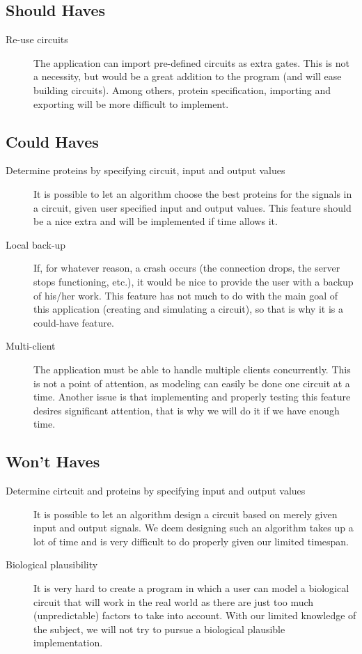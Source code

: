 \documentclass[a4paper]{article}
\begin{document}
\subsection{Should Haves}
\begin{description}
\item[Re-use circuits] The application can import pre-defined circuits as extra gates. This is not a necessity, but would be a great addition to the program (and will ease building circuits). Among others, protein specification, importing and exporting will be more difficult to implement.
\end{description}

\subsection{Could Haves}
\begin{description}
\item[Determine proteins by specifying circuit, input and output values] It is possible to let an algorithm choose the best proteins for the signals in a circuit, given user specified input and output values. This feature should be a nice extra and will be implemented if time allows it.
\item[Local back-up] If, for whatever reason, a crash occurs (the connection drops, the server stops functioning, etc.), it would be nice to provide the user with a backup of his/her work. This feature has not much to do with the main goal of this application (creating and simulating a circuit), so that is why it is a could-have feature.
\item[Multi-client] The application must be able to handle multiple clients concurrently. This is not a point of attention, as modeling can easily be done one circuit at a time. Another issue is that implementing and properly testing this feature desires significant attention, that is why we will do it if we have enough time.
\end{description}

\subsection{Won't Haves}
\begin{description}
\item[Determine cirtcuit and proteins by specifying input and output values] It is possible to let an algorithm design a circuit based on merely given input and output signals. We deem designing such an algorithm takes up a lot of time and is very difficult to do properly given our limited timespan.
\item[Biological plausibility] It is very hard to create a program in which a user can model a biological circuit that will work in the real world as there are just too much (unpredictable) factors to take into account. With our limited knowledge of the subject, we will not try to pursue a biological plausible implementation.
\end{description}
\end{document}

